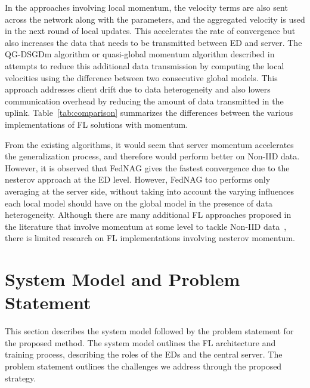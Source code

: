 \documentclass[journal]{IEEEtran}
\begin{document}
In the approaches involving local momentum, the velocity terms are also sent across the network along with the parameters, and the aggregated velocity is used in the next round of local updates. This accelerates the rate of convergence but also increases the data that needs to be transmitted between ED and server. The QG-DSGDm algorithm or quasi-global momentum algorithm described in~\cite{quasi-global-momentum} attempts to reduce this additional data transmission by computing the local velocities using the difference between two consecutive global models. This approach addresses client drift due to data heterogeneity and also lowers communication overhead by reducing the amount of data transmitted in the uplink. Table~\ref{tab:comparison} summarizes the differences between the various implementations of FL solutions with momentum.

From the existing algorithms, it would seem that server momentum accelerates the generalization process, and therefore would perform better on Non-IID data. However, it is observed that FedNAG gives the fastest convergence due to the nesterov approach at the ED level. However, FedNAG too performs only averaging at the server side, without taking into account the varying influences each local model should have on the global model in the presence of data heterogeneity. Although there are many additional FL approaches proposed in the literature that involve momentum at some level to tackle Non-IID data~\cite{fedglomo, flmomentum1}, there is limited research on FL implementations involving nesterov momentum. 

\section{System Model and Problem Statement}
This section describes the system model followed by the problem statement for the proposed method. The system model outlines the FL architecture and training process, describing the roles of the EDs and the central server. The problem statement outlines the challenges we address through the proposed strategy.
\end{document}
